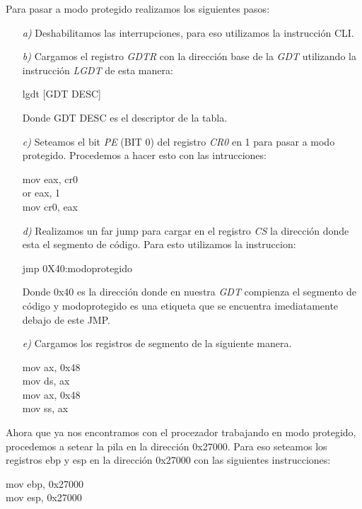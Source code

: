 Para pasar a modo protegido realizamos los siguientes pasos:

\begin{itemize}
\item [\textit{a)}] Deshabilitamos las interrupciones, para eso utilizamos la instrucción CLI.

\item [\textit{b)}] Cargamos el registro \textit{GDTR} con la dirección base de la \textit{\textit{GDT}} utilizando la instrucción \textit{LGDT} de esta manera: 
\begin{center}
lgdt [GDT DESC]
\end{center}
Donde GDT DESC es el descriptor de la tabla.

 \item [\textit{c)}] Seteamos el bit \textit{PE} (BIT 0) del registro \textit{CR0} en 1 para pasar a modo protegido. Procedemos a hacer esto con las intrucciones:
\begin{center}
      mov eax, cr0\\
     or eax, 1   $~~~~$ \\
       mov cr0, eax
    \end{center}

\item [\textit{d)}]Realizamos un far jump para cargar en el registro \textit{CS} la dirección donde esta el segmento de código. Para esto utilizamos la instruccion: 
\\
\begin{center}
jmp 0X40:modoprotegido
\end{center}

Donde 0x40 es la dirección donde en nuestra \textit{GDT} compienza el segmento de código y modoprotegido es una etiqueta que se encuentra imediatamente debajo de este JMP. 

\item [\textit{e)}]Cargamos los registros de segmento de la siguiente manera.

\begin{center}
   mov ax, 0x48\\
    mov ds, ax$~~~$\\
    mov ax, 0x48\\
    mov ss, ax$~~~$\\
\end{center}


\end{itemize}

Ahora que ya nos encontramos con el procezador trabajando en modo protegido, procedemos a setear la pila en la dirección 0x27000. Para eso seteamos los registros ebp y esp en la dirección 0x27000 con las siguientes instrucciones: 
\begin{center}
mov ebp, 0x27000\\
mov esp, 0x27000\\
\end{center}

